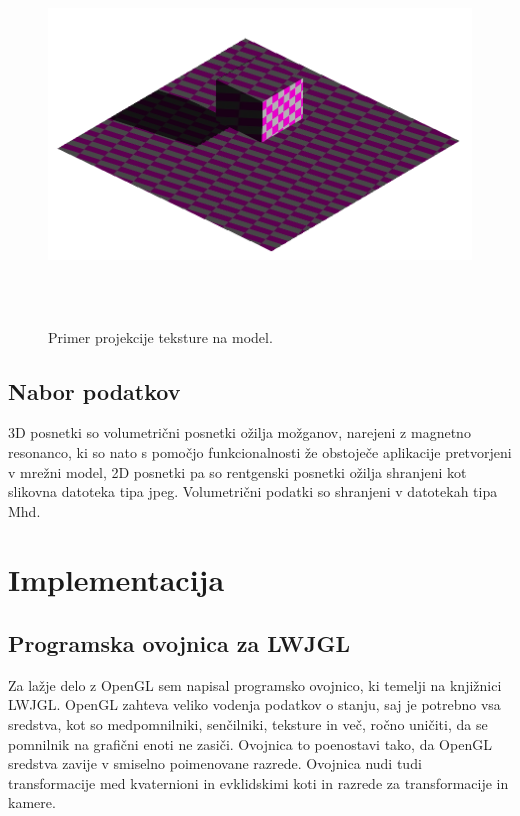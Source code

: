 \documentclass[a4paper, 12pt]{book}
\begin{document}
\begin{figure}[h]
\begin{center}
\includegraphics[width=12cm, height=10cm, keepaspectratio=true]{Tekstura_projecirana_na_model.png}
\end{center}
\caption{Primer projekcije teksture na model.}
\label{teksturaprojecirananamodel}
\end{figure}

\section{Nabor podatkov}
3D posnetki so volumetrični posnetki ožilja možganov, narejeni z magnetno resonanco, ki so nato s pomočjo funkcionalnosti že obstoječe aplikacije pretvorjeni v mrežni model, 2D posnetki pa so rentgenski posnetki ožilja shranjeni kot slikovna datoteka tipa jpeg\cite{jpeg}. Volumetrični podatki so shranjeni v datotekah tipa Mhd\cite{mhd}.

\chapter{Implementacija}
\section{Programska ovojnica za LWJGL}

Za lažje delo z OpenGL sem napisal programsko ovojnico, ki temelji na knjižnici LWJGL. OpenGL zahteva veliko vodenja podatkov o stanju, saj je potrebno vsa sredstva, kot so medpomnilniki, senčilniki, teksture in več, ročno uničiti, da se pomnilnik na grafični enoti ne zasiči. Ovojnica to poenostavi tako, da OpenGL sredstva zavije v smiselno poimenovane razrede. Ovojnica nudi tudi transformacije med kvaternioni in evklidskimi koti in razrede za transformacije in kamere.
\end{document}
